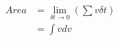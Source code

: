 \documentclass[preview]{standalone}
\begin{document}
\begin{align*}
Area&=\lim_{\delta t\to 0} (\sum v \delta t ) \\ &=\int v dv
\end{align*}
\end{document}
